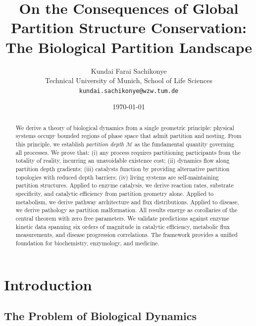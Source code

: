\documentclass[twocolumn,10pt,a4paper]{article}
\theoremstyle{definition}
\theoremstyle{remark}
\newcommand{\Depth}{\mathcal{M}}
\begin{document}
\title{\textbf{On the Consequences of Global Partition Structure Conservation:\\  The Biological Partition Landscape}}

\author{
Kundai Farai Sachikonye\\
Technical University of Munich, School of Life Sciences\\
\texttt{kundai.sachikonye@wzw.tum.de}
}

\date{\today}

\maketitle

\begin{abstract}
\noindent We derive a theory of biological dynamics from a single geometric principle: physical systems occupy bounded regions of phase space that admit partition and nesting. From this principle, we establish \emph{partition depth} $\Depth$ as the fundamental quantity governing all processes. We prove that: (i) any process requires partitioning participants from the totality of reality, incurring an unavoidable existence cost; (ii) dynamics flow along partition depth gradients; (iii) catalysts function by providing alternative partition topologies with reduced depth barriers; (iv) living systems are self-maintaining partition structures. Applied to enzyme catalysis, we derive reaction rates, substrate specificity, and catalytic efficiency from partition geometry alone. Applied to metabolism, we derive pathway architecture and flux distributions. Applied to disease, we derive pathology as partition malformation. All results emerge as corollaries of the central theorem with zero free parameters. We validate predictions against enzyme kinetic data spanning six orders of magnitude in catalytic efficiency, metabolic flux measurements, and disease progression correlations. The framework provides a unified foundation for biochemistry, enzymology, and medicine.
\end{abstract}

\section{Introduction}
\label{sec:introduction}

\subsection{The Problem of Biological Dynamics}
\end{document}
